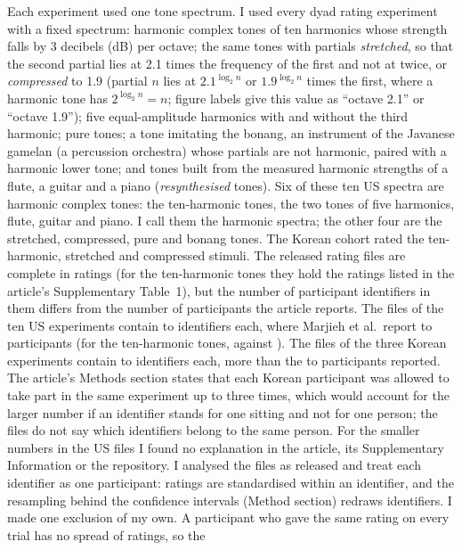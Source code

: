 \documentclass[11pt,a4paper]{article}
\begin{document}
Each experiment used one tone spectrum. I used every dyad
rating experiment with a fixed spectrum: harmonic complex tones of ten harmonics whose
strength falls by 3 decibels (dB) per octave; the same tones with partials \emph{stretched}, so that
the second partial lies at 2.1 times the frequency of the first and not at twice, or
\emph{compressed} to 1.9 (partial $n$ lies at $2.1^{\log_2 n}$ or $1.9^{\log_2 n}$ times the first, where a harmonic
tone has $2^{\log_2 n}=n$; figure labels give this value as ``octave 2.1'' or ``octave 1.9''); five equal-amplitude harmonics with and without the third harmonic;
pure tones; a tone imitating the bonang, an instrument of the Javanese gamelan (a percussion orchestra) whose
partials are not harmonic, paired with a harmonic lower tone; and tones built from the measured harmonic strengths of a flute, a guitar and a piano
(\emph{resynthesised} tones). Six of these ten US spectra are harmonic complex tones: the
ten-harmonic tones, the two tones of five harmonics, flute, guitar and piano. I call them the
harmonic spectra; the other four are the stretched, compressed, pure and bonang tones. The Korean cohort rated the ten-harmonic,
stretched and compressed stimuli. The released rating files are complete in ratings (for the ten-harmonic tones they hold
the \nRelTrialsHarm{} ratings listed in the article's Supplementary Table~1), but the
number of participant identifiers in them differs from the number of participants the
article reports. The files of the ten US experiments contain \nRelUSMin{} to \nRelUSMax{}
identifiers each, where Marjieh et al.\ report \nArtUSMin{} to \nArtUSMax{} participants
(for the ten-harmonic tones, \nRelHarm{} against \nArtHarm). The files of the three Korean
experiments contain \nKRPerExpMin{} to \nKRPerExpMax{} identifiers each, more than the
\nArtKRMin{} to \nArtKRMax{} participants reported. The article's Methods section states that each Korean participant
was allowed to take part in the same experiment up to three times, which would account for
the larger number if an identifier stands for one sitting and not for one person; the files
do not say which identifiers belong to the same person. For the smaller numbers in the US
files I found no explanation in the article, its Supplementary Information or the
repository. I analysed the files as released and treat each
identifier as one participant: ratings are standardised within an identifier, and the
resampling behind the confidence intervals (Method section) redraws identifiers. I made one exclusion of my own. A
participant who gave the same rating on every trial has no spread of ratings, so the
\end{document}
